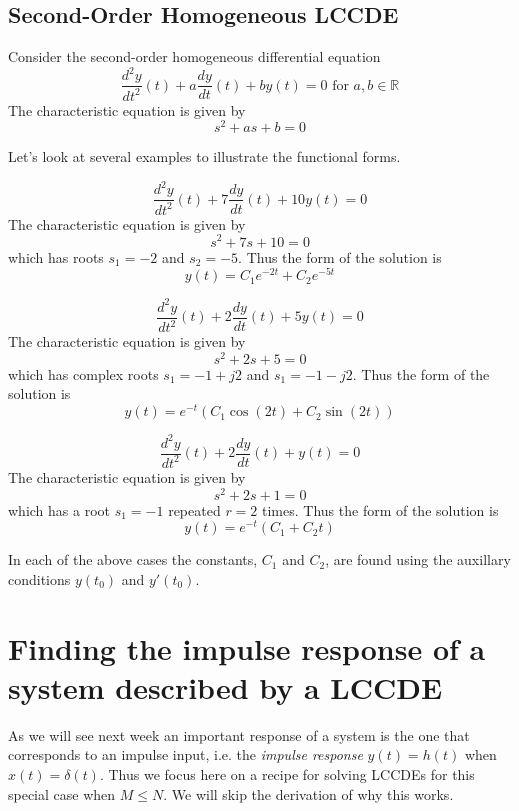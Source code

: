 \subsection{Second-Order Homogeneous LCCDE}

Consider the second-order homogeneous differential equation
\[
\frac{d^2y}{dt^2}(t) + a\frac{dy}{dt}(t) + by(t) = 0 \mbox{ for } a,b \in \mathbb{R}
\]
The characteristic equation is given by
\[
s^2 + as + b = 0
\]

Let's look at several examples to illustrate the functional forms.

\begin{example}
\[
\frac{d^2y}{dt^2}(t) + 7\frac{dy}{dt}(t) + 10y(t) = 0 
\]
The characteristic equation is given by
\[
s^2 + 7s + 10 = 0
\]
which has roots $s_1 = -2$ and $s_2 = -5$. Thus the form of the solution is
\[
y(t) = C_1e^{-2t} + C_2e^{-5t}
\]

\end{example}

\begin{example}
\[
\frac{d^2y}{dt^2}(t) + 2\frac{dy}{dt}(t) + 5y(t) = 0 
\]
The characteristic equation is given by
\[
s^2 + 2s + 5 = 0
\]
which has complex roots $s_1 = -1+j2$ and $s_1 = -1-j2$. Thus the form of the solution is
\[
y(t) = e^{-t}\left(C_1\cos(2t) + C_2\sin(2t)\right)
\]
\end{example}

\begin{example}
\[
\frac{d^2y}{dt^2}(t) + 2\frac{dy}{dt}(t) + y(t) = 0 
\]
The characteristic equation is given by
\[
s^2 + 2s + 1 = 0
\]
which has a root $s_1 = -1$ repeated $r=2$ times. Thus the form of the solution is
\[
y(t) = e^{-t}\left(C_1 + C_2t\right)
\]
\end{example}

In each of the above cases the constants, $C_1$ and $C_2$, are found using the auxillary conditions $y(t_0)$ and $y\prime(t_0)$.

\section{Finding the impulse response of a system described by a LCCDE}

As we will see next week an important response of a system is the one that corresponds to an impulse input, i.e. the \emph{impulse response} $y(t) = h(t)$ when $x(t) = \delta(t)$. Thus we focus here on a recipe for solving LCCDEs for this special case when $M \leq N$. We will skip the derivation of why this works.


